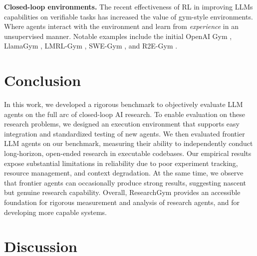 \documentclass[11pt]{article}
\let\cite\citep
\theoremstyle{plain}
\theoremstyle{definition}
\theoremstyle{remark}
\begin{document}
\textbf{Closed-loop environments.} The recent effectiveness of RL in improving LLMs capabilities on verifiable tasks \cite{deepseekai2025deepseekr1incentivizingreasoningcapability} has increased the value of gym-style environments. Where agents interact with the environment and learn from \emph{experience} in an unsupervised manner. Notable examples include the initial OpenAI Gym \cite{1606.01540}, LlamaGym \cite{pandey2024llamagym}, LMRL-Gym \cite{abdulhai2025lmrl}, SWE-Gym \cite{pan2025training}, and R2E-Gym \cite{jain2025r2egymproceduralenvironmentshybrid}. 

\section{Conclusion}

In this work, we developed a rigorous benchmark to objectively evaluate LLM agents on the full arc of closed-loop AI research. To enable evaluation on these research problems, we designed an execution environment that supports easy integration and standardized testing of new agents. We then evaluated frontier LLM agents on our benchmark, measuring their ability to independently conduct long-horizon, open-ended research in executable codebases. Our empirical results expose substantial limitations in reliability due to poor experiment tracking, resource management, and context degradation. At the same time, we observe that frontier agents can occasionally produce strong results, suggesting nascent but genuine research capability. Overall, ResearchGym provides an accessible foundation for rigorous measurement and analysis of research agents, and for developing more capable systems.

\section*{Discussion}
\end{document}
